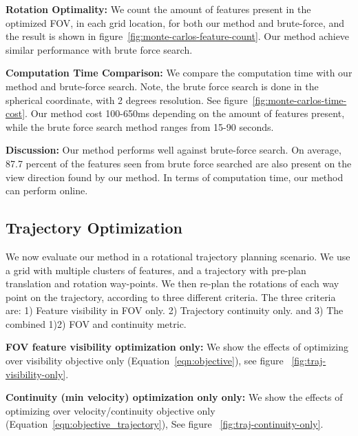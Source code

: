 \documentclass[letterpaper, 10 pt, conference]{ieeeconf}  %
\begin{document}
\noindent \textbf{Rotation Optimality:}
We count the amount of features present in the optimized FOV, in each grid location, for both our method and brute-force, and the result is shown in figure~\ref{fig:monte-carlos-feature-count}. Our method achieve similar performance with brute force search.

\noindent \textbf{Computation Time Comparison:}
We compare the computation time with our method and brute-force search. Note, the brute force search is done in the spherical coordinate, with 2 degrees resolution. See figure~\ref{fig:monte-carlos-time-cost}. Our method cost 100-650ms depending on the amount of features present, while the brute force search method ranges from 15-90 seconds.

\noindent \textbf{Discussion:} Our method performs well against brute-force search. On average, 87.7 percent of the features seen from brute force searched are also present on the view direction found by our method.  In terms of computation time, our method can perform online.





\subsection{Trajectory Optimization}
We now evaluate our method in a rotational trajectory planning scenario. We use a grid with multiple clusters of features, and a trajectory with pre-plan translation and rotation way-points. We then re-plan the rotations of each way point on the trajectory, according to three different criteria. The three criteria are: 1) Feature visibility in FOV only. 2) Trajectory continuity only. and 3) The combined 1)2) FOV and continuity metric.


\noindent \textbf{FOV feature visibility optimization only:}
We show the effects of optimizing over visibility objective only (Equation~\ref{eqn:objective}), see figure ~\ref{fig:traj-visibility-only}.

\noindent \textbf{Continuity (min velocity) optimization only only:}
We show the effects of optimizing over velocity/continuity objective only (Equation~\ref{eqn:objective_trajectory}), See figure ~\ref{fig:traj-continuity-only}.
\end{document}
